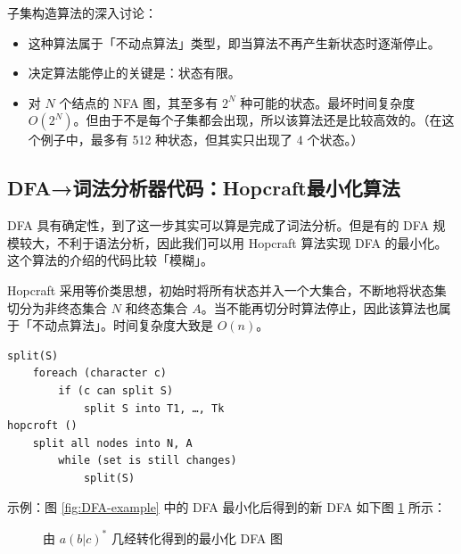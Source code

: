 \documentclass[UTF8]{ctexart}
\newcommand\Emph[1]{\textcolor{cyan!80!black}{#1}}
\newcommand\Notes[1]{\textcolor{yellow!50!black}{\small #1}}
\begin{document}
子集构造算法的深入讨论：

\begin{itemize}[leftmargin=1.5cm]
  \item 这种算法属于\Emph{「不动点算法」}类型，即当算法不再产生新状态时逐渐停止。
  \item 决定算法能停止的关键是：状态有限。
  \item 对 $N$ 个结点的 NFA 图，其至多有 $2^N$ 种可能的状态。最坏时间复杂度 $O(2^N)$。但由于不是每个子集都会出现，所以该算法还是比较高效的。\Notes{（在这个例子中，最多有 512 种状态，但其实只出现了 4 个状态。）}
\end{itemize}

\subsection{DFA→词法分析器代码：Hopcraft最小化算法}
DFA 具有确定性，到了这一步其实可以算是完成了词法分析。但是有的 DFA 规模较大，不利于语法分析，因此我们可以用 \Emph{Hopcraft 算法}实现 DFA 的最小化。这个算法的介绍的代码比较「模糊」。

Hopcraft 采用等价类思想，初始时将所有状态并入一个大集合，不断地将状态集切分为非终态集合 $N$ 和终态集合 $A$。当不能再切分时算法停止，因此该算法也属于「不动点算法」。时间复杂度大致是 $O(n)$。

\begin{lstlisting}
split(S)
    foreach (character c)
        if (c can split S)
            split S into T1, …, Tk
hopcroft ()
    split all nodes into N, A
        while (set is still changes)
            split(S)
\end{lstlisting}

示例：图 \ref{fig:DFA-example} 中的 DFA 最小化后得到的新 DFA 如下图 \ref{fig:DFAmin-example} 所示：
\begin{figure}[htb]
    \centering
    \caption{由 $a(b|c)^*$ 几经转化得到的最小化 DFA 图}\label{fig:DFAmin-example}
\end{figure}
\end{document}
